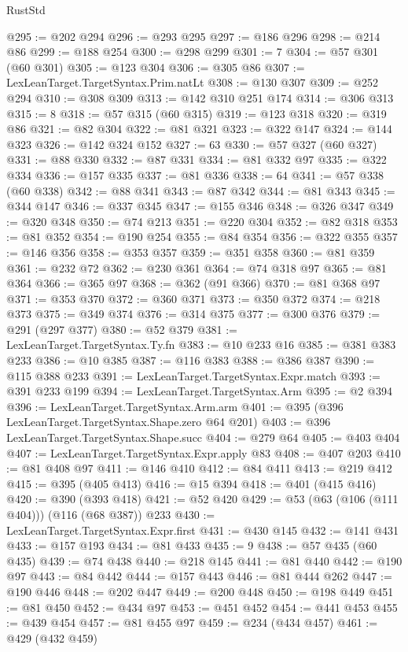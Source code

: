 \begin{lexlean}{RustStd}
\begin{coremodule}
@295 := @202 @294
@296 := @293 @295
@297 := @186 @296
@298 := @214 @86
@299 := @188 @254
@300 := @298 @299
@301 := 7
@304 := @57 @301 (@60 @301)
@305 := @123 @304
@306 := @305 @86
@307 := LexLeanTarget.TargetSyntax.Prim.natLt
@308 := @130 @307
@309 := @252 @294
@310 := @308 @309
@313 := @142 @310 @251 @174
@314 := @306 @313
@315 := 8
@318 := @57 @315 (@60 @315)
@319 := @123 @318
@320 := @319 @86
@321 := @82 @304
@322 := @81 @321
@323 := @322 @147
@324 := @144 @323
@326 := @142 @324 @152
@327 := 63
@330 := @57 @327 (@60 @327)
@331 := @88 @330
@332 := @87 @331
@334 := @81 @332 @97
@335 := @322 @334
@336 := @157 @335
@337 := @81 @336
@338 := 64
@341 := @57 @338 (@60 @338)
@342 := @88 @341
@343 := @87 @342
@344 := @81 @343
@345 := @344 @147
@346 := @337 @345
@347 := @155 @346
@348 := @326 @347
@349 := @320 @348
@350 := @74 @213
@351 := @220 @304
@352 := @82 @318
@353 := @81 @352
@354 := @190 @254
@355 := @84 @354
@356 := @322 @355
@357 := @146 @356
@358 := @353 @357
@359 := @351 @358
@360 := @81 @359
@361 := @232 @72
@362 := @230 @361
@364 := @74 @318 @97
@365 := @81 @364
@366 := @365 @97
@368 := @362 (@91 @366)
@370 := @81 @368 @97
@371 := @353 @370
@372 := @360 @371
@373 := @350 @372
@374 := @218 @373
@375 := @349 @374
@376 := @314 @375
@377 := @300 @376
@379 := @291 (@297 @377)
@380 := @52 @379
@381 := LexLeanTarget.TargetSyntax.Ty.fn
@383 := @10 @233 @16
@385 := @381 @383 @233
@386 := @10 @385
@387 := @116 @383
@388 := @386 @387
@390 := @115 @388 @233
@391 := LexLeanTarget.TargetSyntax.Expr.match
@393 := @391 @233 @199
@394 := LexLeanTarget.TargetSyntax.Arm
@395 := @2 @394
@396 := LexLeanTarget.TargetSyntax.Arm.arm
@401 := @395 (@396 LexLeanTarget.TargetSyntax.Shape.zero @64 @201)
@403 := @396 LexLeanTarget.TargetSyntax.Shape.succ
@404 := @279 @64
@405 := @403 @404
@407 := LexLeanTarget.TargetSyntax.Expr.apply @83
@408 := @407 @203
@410 := @81 @408 @97
@411 := @146 @410
@412 := @84 @411
@413 := @219 @412
@415 := @395 (@405 @413)
@416 := @15 @394
@418 := @401 (@415 @416)
@420 := @390 (@393 @418)
@421 := @52 @420
@429 := @53 (@63 (@106 (@111 @404))) (@116 (@68 @387)) @233
@430 := LexLeanTarget.TargetSyntax.Expr.first
@431 := @430 @145
@432 := @141 @431
@433 := @157 @193
@434 := @81 @433
@435 := 9
@438 := @57 @435 (@60 @435)
@439 := @74 @438
@440 := @218 @145
@441 := @81 @440
@442 := @190 @97
@443 := @84 @442
@444 := @157 @443
@446 := @81 @444 @262
@447 := @190 @446
@448 := @202 @447
@449 := @200 @448
@450 := @198 @449
@451 := @81 @450
@452 := @434 @97
@453 := @451 @452
@454 := @441 @453
@455 := @439 @454
@457 := @81 @455 @97
@459 := @234 (@434 @457)
@461 := @429 (@432 @459)

\end{coremodule}
\end{lexlean}
